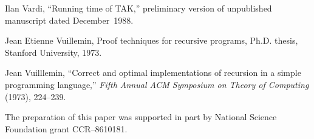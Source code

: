 \bib 
[14]\enspace
Ilan Vardi, ``Running time of TAK,'' preliminary version of
unpublished manuscript dated December~1988.

\bib
[15]\enspace
Jean Etienne Vuillemin, Proof techniques for recursive programs, Ph.D.
thesis, Stanford University, 1973.

\bib
[16]\enspace
Jean Vuilllemin, ``Correct and optimal implementations of recursion in
a simple programming language,'' {\sl Fifth Annual ACM Symposium on Theory
of Computing\/} (1973), 224--239.

\bigskip\bigskip

The preparation of this paper was supported in part by National
Science Foundation grant CCR--8610181.

\bye

